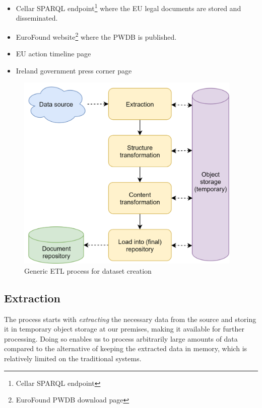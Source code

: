 \begin{itemize}
	\item Cellar SPARQL endpoint\footnote{ Cellar SPARQL endpoint  } where the EU legal documents are stored and disseminated. 
	\item EuroFound website\footnote{ EuroFound PWDB download page } where the PWDB is published.
	\item EU action timeline page

	\item Ireland government press corner page
\end{itemize}

\begin{Center}
\begin{figure}[h]
	\begin{Center}
		\includegraphics[width=4.24in,height=3.75in]{images/image5.png}
		\caption{Generic ETL process for dataset creation}
		\label{fig:Generic_ETL_process_for_dataset_creation}
	\end{Center}
\end{figure}
\end{Center}

\subsection{Extraction}

The process starts with \textit{extracting} the necessary data from the source and storing it in temporary object storage at our premises, making it available for further processing. Doing so enables us to process arbitrarily large amounts of data compared to the alternative of keeping the extracted data in memory, which is relatively limited on the traditional systems. 

